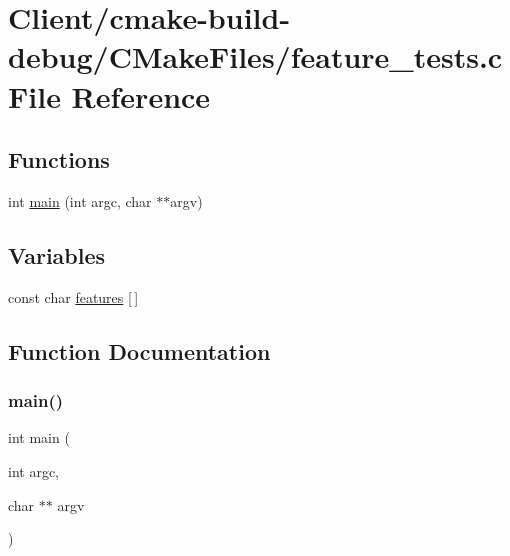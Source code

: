 \hypertarget{Client_2cmake-build-debug_2CMakeFiles_2feature__tests_8c}{}\section{Client/cmake-\/build-\/debug/\+C\+Make\+Files/feature\+\_\+tests.c File Reference}
\label{Client_2cmake-build-debug_2CMakeFiles_2feature__tests_8c}
\subsection*{Functions}
\begin{DoxyCompactItemize}
\item 
int \mbox{\hyperlink{Client_2cmake-build-debug_2CMakeFiles_2feature__tests_8c_a3c04138a5bfe5d72780bb7e82a18e627}{main}} (int argc, char $\ast$$\ast$argv)
\end{DoxyCompactItemize}
\subsection*{Variables}
\begin{DoxyCompactItemize}
\item 
const char \mbox{\hyperlink{Client_2cmake-build-debug_2CMakeFiles_2feature__tests_8c_a1582568e32f689337602a16bf8a5bff0}{features}} \mbox{[}$\,$\mbox{]}
\end{DoxyCompactItemize}


\subsection{Function Documentation}
\mbox{\label{Client_2cmake-build-debug_2CMakeFiles_2feature__tests_8c_a3c04138a5bfe5d72780bb7e82a18e627}} 
\subsubsection{\texorpdfstring{main()}{main()}}
{\footnotesize\ttfamily int main (\begin{DoxyParamCaption}\item[{int}]{argc,  }\item[{char $\ast$$\ast$}]{argv }\end{DoxyParamCaption})}



